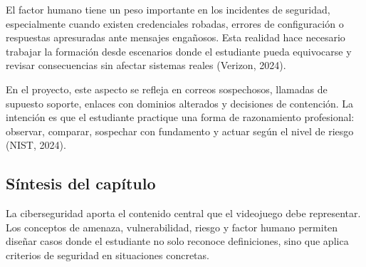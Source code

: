 El factor humano tiene un peso importante en los incidentes de seguridad, especialmente cuando existen credenciales robadas, errores de configuraci\'{o}n o respuestas apresuradas ante mensajes enga\~{n}osos. Esta realidad hace necesario trabajar la formaci\'{o}n desde escenarios donde el estudiante pueda equivocarse y revisar consecuencias sin afectar sistemas reales (Verizon, 2024).

En el proyecto, este aspecto se refleja en correos sospechosos, llamadas de supuesto soporte, enlaces con dominios alterados y decisiones de contenci\'{o}n. La intenci\'{o}n es que el estudiante practique una forma de razonamiento profesional: observar, comparar, sospechar con fundamento y actuar seg\'{u}n el nivel de riesgo (NIST, 2024).

\subsection{S\'{i}ntesis del cap\'{i}tulo}

La ciberseguridad aporta el contenido central que el videojuego debe representar. Los conceptos de amenaza, vulnerabilidad, riesgo y factor humano permiten dise\~{n}ar casos donde el estudiante no solo reconoce definiciones, sino que aplica criterios de seguridad en situaciones concretas.
